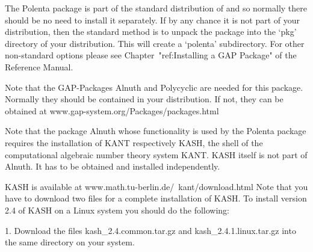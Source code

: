 
\null

The Polenta package is part of the standard distribution of {\GAP} and
so normally there should be no need to install it separately.
If by any chance it is not part of your {\GAP} distribution, then 
the standard method is to unpack	 the package into the `pkg'
directory  of your {\GAP} distribution.  This will create a `polenta'
subdirectory. 
For other non-standard options please see  Chapter~"ref:Installing a
GAP Package" of the {\GAP} Reference Manual.

Note that the GAP-Packages Alnuth and Polycyclic are needed for this package.
Normally they should be contained in your distribution. If not, 
they can be obtained at
\begintt
               www.gap-system.org/Packages/packages.html             

\endtt



                    
Note that the {\GAP} package Alnuth whose functionality is used by the Polenta
package requires the installation of KANT respectively
KASH, the shell
of the computational algebraic number theory system KANT.  KASH itself
is not part of Alnuth.  It has to be obtained and installed
independently.
                                                            
KASH is available at
\begintt
               www.math.tu-berlin.de/~kant/download.html
\endtt
Note that you have to download two files for a complete installation
of KASH.  To install version 2.4 of KASH on a Linux
system you should do the following:
\beginlist
\item{1.} Download the files
    kash_2.4.common.tar.gz and kash_2.4.1.linux.tar.gz
    into the same directory on your system.
                                                                               
